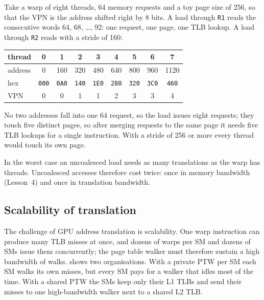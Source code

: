 \documentclass[../main.tex]{subfiles}
\begin{document}
\begin{example}
  \label{ex:l07-tlb-coalescing}
  Take a warp of eight threads, \SI{64}{\byte} memory requests and a
  toy page size of \SI{256}{\byte}, so that the VPN is the address
  shifted right by 8 bits.  A load through \texttt{R1} reads
  the consecutive words 64, 68, \ldots, 92: one request, one page, one
  TLB lookup.  A load through \texttt{R2} reads with a stride of
  \SI{160}{\byte}:
  \begin{center}
    \small
    \begin{tabular}{@{}lcccccccc@{}}
      \toprule
      thread & 0 & 1 & 2 & 3 & 4 & 5 & 6 & 7 \\
      \midrule
      address & 0 & 160 & 320 & 480 & 640 & 800 & 960 & 1120 \\
      hex & \texttt{000} & \texttt{0A0} & \texttt{140} & \texttt{1E0} & \texttt{280} & \texttt{320} & \texttt{3C0} & \texttt{460} \\
      VPN & 0 & 0 & 1 & 1 & 2 & 3 & 3 & 4 \\
      \bottomrule
    \end{tabular}
  \end{center}
  No two addresses fall into one \SI{64}{\byte} request, so the load
  issues eight requests; they touch five distinct pages, so after
  merging requests to the same page it needs five TLB lookups for a
  single instruction.  With a stride of \SI{256}{\byte} or more every
  thread would touch its own page.
\end{example}

In the worst case an uncoalesced load needs as many translations as
the warp has threads.  Uncoalesced accesses
therefore cost twice: once in memory bandwidth (Lesson~4) and once in
translation bandwidth.

\subsection{Scalability of translation}

The challenge of GPU address translation is scalability.  One warp
instruction can produce many TLB misses at once, and dozens of warps
per SM and dozens of SMs issue them concurrently; the page table walker
must therefore sustain a high bandwidth of walks.   shows two
organisations.  With a private PTW per SM each SM walks its own
misses, but every SM pays for a walker that idles most of the time.
With a shared PTW the SMs keep only their L1 TLBs and send their misses
to one high-bandwidth walker next to a shared L2 TLB.
\end{document}

